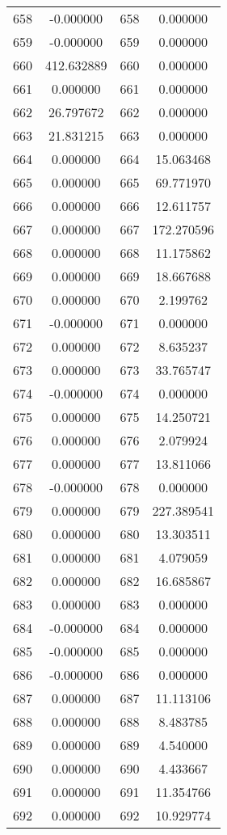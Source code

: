 \documentclass[12pt]{article}
\begin{document}
\begin{longtable}{@{}cccc@{}}
658 & -0.000000 & 658 & 0.000000 \\
659 & -0.000000 & 659 & 0.000000 \\
660 & 412.632889 & 660 & 0.000000 \\
661 & 0.000000 & 661 & 0.000000 \\
662 & 26.797672 & 662 & 0.000000 \\
663 & 21.831215 & 663 & 0.000000 \\
664 & 0.000000 & 664 & 15.063468 \\
665 & 0.000000 & 665 & 69.771970 \\
666 & 0.000000 & 666 & 12.611757 \\
667 & 0.000000 & 667 & 172.270596 \\
668 & 0.000000 & 668 & 11.175862 \\
669 & 0.000000 & 669 & 18.667688 \\
670 & 0.000000 & 670 & 2.199762 \\
671 & -0.000000 & 671 & 0.000000 \\
672 & 0.000000 & 672 & 8.635237 \\
673 & 0.000000 & 673 & 33.765747 \\
674 & -0.000000 & 674 & 0.000000 \\
675 & 0.000000 & 675 & 14.250721 \\
676 & 0.000000 & 676 & 2.079924 \\
677 & 0.000000 & 677 & 13.811066 \\
678 & -0.000000 & 678 & 0.000000 \\
679 & 0.000000 & 679 & 227.389541 \\
680 & 0.000000 & 680 & 13.303511 \\
681 & 0.000000 & 681 & 4.079059 \\
682 & 0.000000 & 682 & 16.685867 \\
683 & 0.000000 & 683 & 0.000000 \\
684 & -0.000000 & 684 & 0.000000 \\
685 & -0.000000 & 685 & 0.000000 \\
686 & -0.000000 & 686 & 0.000000 \\
687 & 0.000000 & 687 & 11.113106 \\
688 & 0.000000 & 688 & 8.483785 \\
689 & 0.000000 & 689 & 4.540000 \\
690 & 0.000000 & 690 & 4.433667 \\
691 & 0.000000 & 691 & 11.354766 \\
692 & 0.000000 & 692 & 10.929774 \\

\end{longtable}
\end{document}
